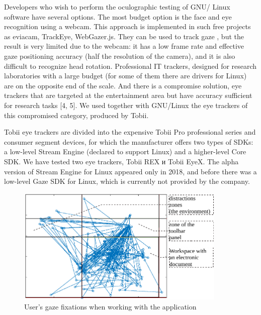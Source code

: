 \documentclass[10pt, a5paper]{article}
\begin{document}
Developers who wish to perform the oculographic testing of GNU/ Linux software have several options. The most budget option is the face and eye recognition using a webcam. This approach is implemented in such free projects as eviacam, TrackEye, WebGazer.js. They can be used to track gaze \cite{bib3}, but the result is very limited due to the webcam: it has a low frame rate and effective gaze positioning accuracy (half the resolution of the camera), and it is also difficult to recognize head rotation. Professional IT trackers, designed for research laboratories with a large budget (for some of them there are drivers for Linux) are on the opposite end of the scale. And there is a compromise solution, eye trackers that are targeted at the entertainment area but have accuracy sufficient for research tasks [4, 5]. We used together with GNU/Linux the eye trackers of this compromised category, produced by Tobii.

Tobii eye trackers are divided into the expensive Tobii Pro \linebreak professional series and consumer segment devices, for which the \linebreak manufacturer offers two types of SDKs: a low-level Stream Engine (declared to support Linux) and a higher-level Core SDK. We have tested two eye trackers, Tobii REX и Tobii EyeX. The alpha version of Stream Engine for Linux appeared only in 2018, and before there was a low-level Gaze SDK for Linux, which is currently not provided by the company.

\begin{center}
\begin{figure}[h!]
  \centering
  \includegraphics[width=10cm]{Markina1}
  \caption{User's gaze fixations when working with the application}	
  \label{markina:fig1}
\end{figure}
\end{center}
\end{document}
